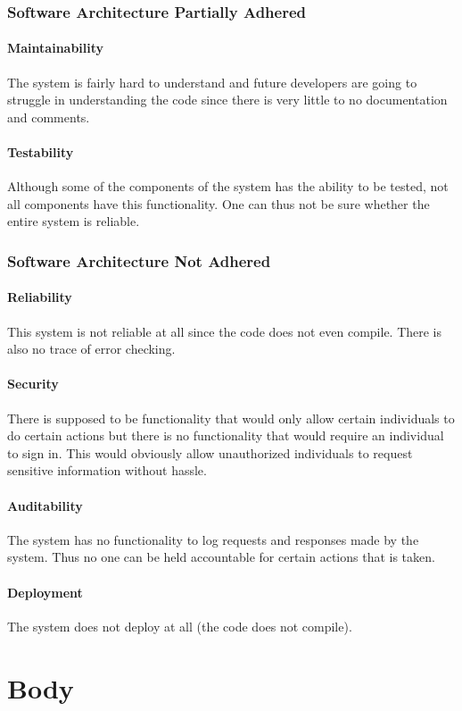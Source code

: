 \documentclass{article}
\begin{document}
		\subsubsection{Software Architecture Partially Adhered}
			\paragraph{Maintainability} The system is fairly hard to understand and future developers are going to struggle in understanding the code since there is very little to no documentation and comments.
			\paragraph{Testability} Although some of the components of the system has the ability to be tested, not all components have this functionality. One can thus not be sure whether the entire system is reliable.			
			
		\subsubsection{Software Architecture Not Adhered}
			\paragraph{Reliability} This system is not reliable at all since the code does not even compile. There is also no trace of error checking.
			\paragraph{Security} There is supposed to be functionality that would only allow certain individuals to do certain actions but there is no functionality that would require an individual to sign in. This would obviously allow unauthorized individuals to request sensitive information without hassle.
			\paragraph{Auditability} The system has no functionality to log requests and responses made by the system. Thus no one can be held accountable for certain actions that is taken.
			\paragraph{Deployment} The system does not deploy at all (the code does not compile).
\section{Body}
\lipsum[1]
\end{document}
